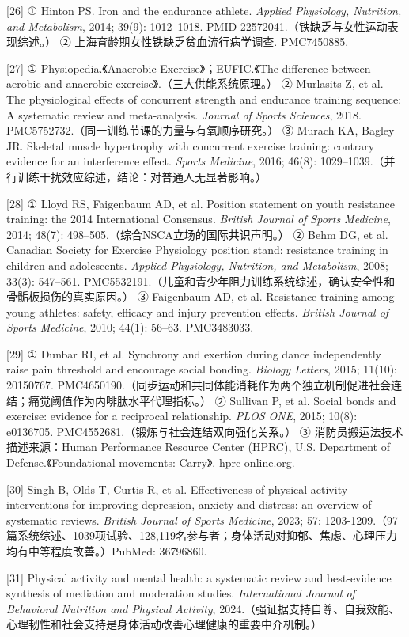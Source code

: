 \documentclass[UTF8,zihao=-4,oneside]{ctexart}
\begin{document}
[26] ① Hinton PS. Iron and the endurance athlete. \emph{Applied Physiology, Nutrition, and Metabolism}, 2014; 39(9): 1012–1018. PMID 22572041.（铁缺乏与女性运动表现综述。） ② 上海育龄期女性铁缺乏贫血流行病学调查. PMC7450885.

[27] ① Physiopedia.《Anaerobic Exercise》；EUFIC.《The difference between aerobic and anaerobic exercise》.（三大供能系统原理。） ② Murlasits Z, et al. The physiological effects of concurrent strength and endurance training sequence: A systematic review and meta-analysis. \emph{Journal of Sports Sciences}, 2018. PMC5752732.（同一训练节课的力量与有氧顺序研究。） ③ Murach KA, Bagley JR. Skeletal muscle hypertrophy with concurrent exercise training: contrary evidence for an interference effect. \emph{Sports Medicine}, 2016; 46(8): 1029–1039.（并行训练干扰效应综述，结论：对普通人无显著影响。）

[28] ① Lloyd RS, Faigenbaum AD, et al. Position statement on youth resistance training: the 2014 International Consensus. \emph{British Journal of Sports Medicine}, 2014; 48(7): 498–505.（综合NSCA立场的国际共识声明。） ② Behm DG, et al. Canadian Society for Exercise Physiology position stand: resistance training in children and adolescents. \emph{Applied Physiology, Nutrition, and Metabolism}, 2008; 33(3): 547–561. PMC5532191.（儿童和青少年阻力训练系统综述，确认安全性和骨骺板损伤的真实原因。） ③ Faigenbaum AD, et al. Resistance training among young athletes: safety, efficacy and injury prevention effects. \emph{British Journal of Sports Medicine}, 2010; 44(1): 56–63. PMC3483033.

[29] ① Dunbar RI, et al. Synchrony and exertion during dance independently raise pain threshold and encourage social bonding. \emph{Biology Letters}, 2015; 11(10): 20150767. PMC4650190.（同步运动和共同体能消耗作为两个独立机制促进社会连结；痛觉阈值作为内啡肽水平代理指标。） ② Sullivan P, et al. Social bonds and exercise: evidence for a reciprocal relationship. \emph{PLOS ONE}, 2015; 10(8): e0136705. PMC4552681.（锻炼与社会连结双向强化关系。） ③ 消防员搬运法技术描述来源：Human Performance Resource Center (HPRC), U.S. Department of Defense.《Foundational movements: Carry》. hprc-online.org.

[30] Singh B, Olds T, Curtis R, et al. Effectiveness of physical activity interventions for improving depression, anxiety and distress: an overview of systematic reviews. \emph{British Journal of Sports Medicine}, 2023; 57: 1203-1209.（97篇系统综述、1039项试验、128,119名参与者；身体活动对抑郁、焦虑、心理压力均有中等程度改善。）PubMed: 36796860.

[31] Physical activity and mental health: a systematic review and best-evidence synthesis of mediation and moderation studies. \emph{International Journal of Behavioral Nutrition and Physical Activity}, 2024.（强证据支持自尊、自我效能、心理韧性和社会支持是身体活动改善心理健康的重要中介机制。）
\end{document}
